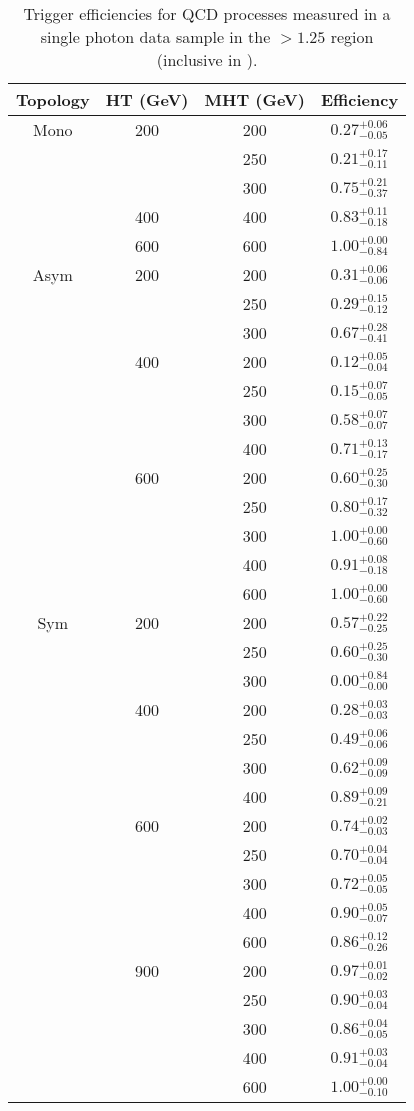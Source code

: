 \begin{table}[h!]
\tiny
\centering
\caption{Trigger efficiencies for QCD processes measured in a single photon 
data sample in the \mhtmet$>1.25$ region (inclusive in \bdphi).}
\begin{tabular}{cccc}
\hline \hline
Topology & HT (GeV) & MHT (GeV) & Efficiency \\
\hline
\hline
Mono & 200 & 200 & $0.27^{+0.06}_{-0.05}$ \\
 &  & 250 & $0.21^{+0.17}_{-0.11}$ \\
 &  & 300 & $0.75^{+0.21}_{-0.37}$ \\
\hline
 & 400 & 400 & $0.83^{+0.11}_{-0.18}$ \\
\hline
 & 600 & 600 & $1.00^{+0.00}_{-0.84}$ \\
\hline
\hline
Asym & 200 & 200 & $0.31^{+0.06}_{-0.06}$ \\
 &  & 250 & $0.29^{+0.15}_{-0.12}$ \\
 &  & 300 & $0.67^{+0.28}_{-0.41}$ \\
\hline
 & 400 & 200 & $0.12^{+0.05}_{-0.04}$ \\
 &  & 250 & $0.15^{+0.07}_{-0.05}$ \\
 &  & 300 & $0.58^{+0.07}_{-0.07}$ \\
 &  & 400 & $0.71^{+0.13}_{-0.17}$ \\
\hline
 & 600 & 200 & $0.60^{+0.25}_{-0.30}$ \\
 &  & 250 & $0.80^{+0.17}_{-0.32}$ \\
 &  & 300 & $1.00^{+0.00}_{-0.60}$ \\
 &  & 400 & $0.91^{+0.08}_{-0.18}$ \\
 &  & 600 & $1.00^{+0.00}_{-0.60}$ \\
\hline
\hline
Sym & 200 & 200 & $0.57^{+0.22}_{-0.25}$ \\
 &  & 250 & $0.60^{+0.25}_{-0.30}$ \\
 &  & 300 & $0.00^{+0.84}_{-0.00}$ \\
\hline
 & 400 & 200 & $0.28^{+0.03}_{-0.03}$ \\
 &  & 250 & $0.49^{+0.06}_{-0.06}$ \\
 &  & 300 & $0.62^{+0.09}_{-0.09}$ \\
 &  & 400 & $0.89^{+0.09}_{-0.21}$ \\
\hline
 & 600 & 200 & $0.74^{+0.02}_{-0.03}$ \\
 &  & 250 & $0.70^{+0.04}_{-0.04}$ \\
 &  & 300 & $0.72^{+0.05}_{-0.05}$ \\
 &  & 400 & $0.90^{+0.05}_{-0.07}$ \\
 &  & 600 & $0.86^{+0.12}_{-0.26}$ \\
\hline
 & 900 & 200 & $0.97^{+0.01}_{-0.02}$ \\
 &  & 250 & $0.90^{+0.03}_{-0.04}$ \\
 &  & 300 & $0.86^{+0.04}_{-0.05}$ \\
 &  & 400 & $0.91^{+0.03}_{-0.04}$ \\
 &  & 600 & $1.00^{+0.00}_{-0.10}$ \\

\hline
\hline
\end{tabular}
\end{table}

